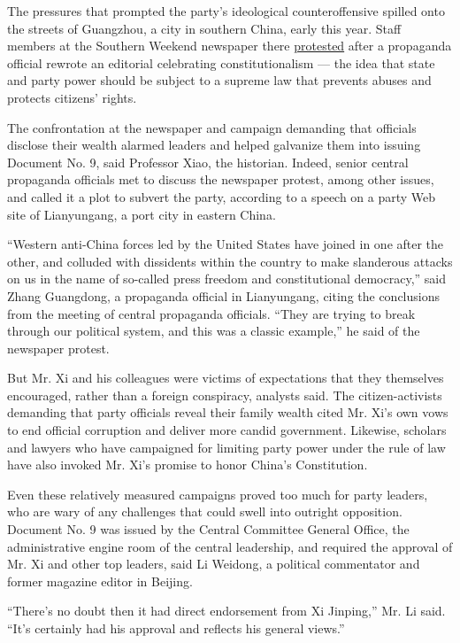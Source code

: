 The pressures that prompted the party's ideological counteroffensive
spilled onto the streets of Guangzhou, a city in southern China, early
this year. Staff members at the Southern Weekend newspaper there
\href{http://www.nytimes.com/2013/01/07/world/asia/chinese-newspaper-challenges-the-censors.html}{protested}
after a propaganda official rewrote an editorial celebrating
constitutionalism --- the idea that state and party power should be
subject to a supreme law that prevents abuses and protects citizens'
rights.

The confrontation at the newspaper and campaign demanding that officials
disclose their wealth alarmed leaders and helped galvanize them into
issuing Document No. 9, said Professor Xiao, the historian. Indeed,
senior central propaganda officials met to discuss the newspaper
protest, among other issues, and called it a plot to subvert the party,
according to a speech on a party Web site of Lianyungang, a port city in
eastern China.

``Western anti-China forces led by the United States have joined in one
after the other, and colluded with dissidents within the country to make
slanderous attacks on us in the name of so-called press freedom and
constitutional democracy,'' said Zhang Guangdong, a propaganda official
in Lianyungang, citing the conclusions from the meeting of central
propaganda officials. ``They are trying to break through our political
system, and this was a classic example,'' he said of the newspaper
protest.

But Mr. Xi and his colleagues were victims of expectations that they
themselves encouraged, rather than a foreign conspiracy, analysts said.
The citizen-activists demanding that party officials reveal their family
wealth cited Mr. Xi's own vows to end official corruption and deliver
more candid government. Likewise, scholars and lawyers who have
campaigned for limiting party power under the rule of law have also
invoked Mr. Xi's promise to honor China's Constitution.

Even these relatively measured campaigns proved too much for party
leaders, who are wary of any challenges that could swell into outright
opposition. Document No. 9 was issued by the Central Committee General
Office, the administrative engine room of the central leadership, and
required the approval of Mr. Xi and other top leaders, said Li Weidong,
a political commentator and former magazine editor in Beijing.

``There's no doubt then it had direct endorsement from Xi Jinping,'' Mr.
Li said. ``It's certainly had his approval and reflects his general
views.''


